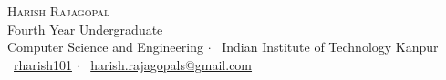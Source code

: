 \newcommand{\sep}{$\cdot$ }  %

\begin{center}

\textsc{\huge Harish Rajagopal}\\[2mm]
Fourth Year Undergraduate\\[1mm]
Computer Science and Engineering \sep\ Indian Institute of Technology Kanpur\\[1mm]
{\faGithub\ \href{https://github.com/rharish101}{rharish101}} \sep%
{\faEnvelopeO\ \href{mailto:harish.rajagopals@gmail.com}{harish.rajagopals@gmail.com}}

\end{center}
